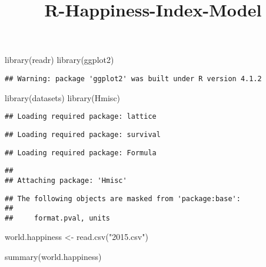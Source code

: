 \documentclass[
]{article}
\title{R-Happiness-Index-Model}
\author{}
\date{\vspace{-2.5em}}
\newenvironment{Shaded}{\begin{snugshade}}{\end{snugshade}}
\newcommand{\FunctionTok}[1]{\textcolor[rgb]{0.00,0.00,0.00}{#1}}
\newcommand{\NormalTok}[1]{#1}
\newcommand{\OtherTok}[1]{\textcolor[rgb]{0.56,0.35,0.01}{#1}}
\newcommand{\StringTok}[1]{\textcolor[rgb]{0.31,0.60,0.02}{#1}}
\begin{document}
\maketitle

\begin{Shaded}
\begin{Highlighting}[]
\FunctionTok{library}\NormalTok{(readr)}
\FunctionTok{library}\NormalTok{(ggplot2)}
\end{Highlighting}
\end{Shaded}

\begin{verbatim}
## Warning: package 'ggplot2' was built under R version 4.1.2
\end{verbatim}

\begin{Shaded}
\begin{Highlighting}[]
\FunctionTok{library}\NormalTok{(datasets)}
\FunctionTok{library}\NormalTok{(Hmisc)}
\end{Highlighting}
\end{Shaded}

\begin{verbatim}
## Loading required package: lattice
\end{verbatim}

\begin{verbatim}
## Loading required package: survival
\end{verbatim}

\begin{verbatim}
## Loading required package: Formula
\end{verbatim}

\begin{verbatim}
## 
## Attaching package: 'Hmisc'
\end{verbatim}

\begin{verbatim}
## The following objects are masked from 'package:base':
## 
##     format.pval, units
\end{verbatim}

\begin{Shaded}
\begin{Highlighting}[]
\NormalTok{world.happiness }\OtherTok{\textless{}{-}} \FunctionTok{read.csv}\NormalTok{(}\StringTok{"2015.csv"}\NormalTok{)}
\end{Highlighting}
\end{Shaded}

\begin{Shaded}
\begin{Highlighting}[]
\FunctionTok{summary}\NormalTok{(world.happiness)}
\end{Highlighting}
\end{Shaded}
\end{document}
